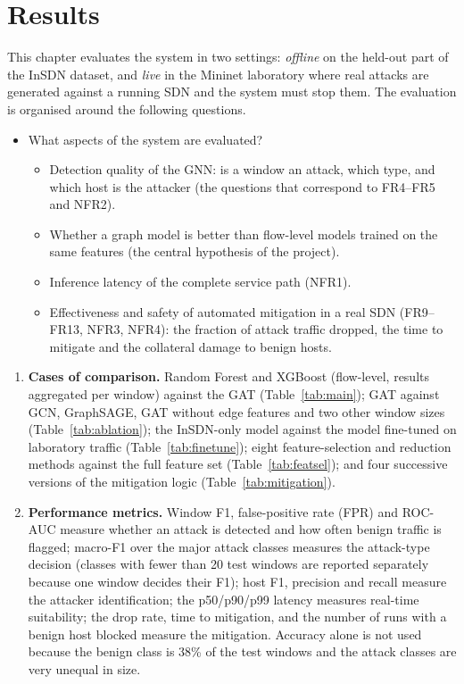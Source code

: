 \chapter{Results}

This chapter evaluates the system in two settings: \emph{offline} on the held-out part of the InSDN dataset, and \emph{live} in the Mininet laboratory where real attacks are generated against a running SDN and the system must stop them. The evaluation is organised around the following questions.

\begin{itemize}
	\item What aspects of the system are evaluated?
		\begin{itemize}
			\item Detection quality of the GNN: is a window an attack, which type, and which host is the attacker (the questions that correspond to FR4--FR5 and NFR2).
			\item Whether a graph model is better than flow-level models trained on the same features (the central hypothesis of the project).
			\item Inference latency of the complete service path (NFR1).
			\item Effectiveness and safety of automated mitigation in a real SDN (FR9--FR13, NFR3, NFR4): the fraction of attack traffic dropped, the time to mitigate and the collateral damage to benign hosts.
		\end{itemize}
\end{itemize}

\begin{enumerate}[label=\Roman*]
	\item \textbf{Cases of comparison.} Random Forest and XGBoost (flow-level, results aggregated per window) against the GAT (Table~\ref{tab:main}); GAT against GCN, GraphSAGE, GAT without edge features and two other window sizes (Table~\ref{tab:ablation}); the InSDN-only model against the model fine-tuned on laboratory traffic (Table~\ref{tab:finetune}); eight feature-selection and reduction methods against the full feature set (Table~\ref{tab:featsel}); and four successive versions of the mitigation logic (Table~\ref{tab:mitigation}).
	\item \textbf{Performance metrics.} Window F1, false-positive rate (FPR) and ROC-AUC measure whether an attack is detected and how often benign traffic is flagged; macro-F1 over the major attack classes measures the attack-type decision (classes with fewer than 20 test windows are reported separately because one window decides their F1); host F1, precision and recall measure the attacker identification; the p50/p90/p99 latency measures real-time suitability; the drop rate, time to mitigation, and the number of runs with a benign host blocked measure the mitigation. Accuracy alone is not used because the benign class is 38\% of the test windows and the attack classes are very unequal in size.
\end{enumerate}

